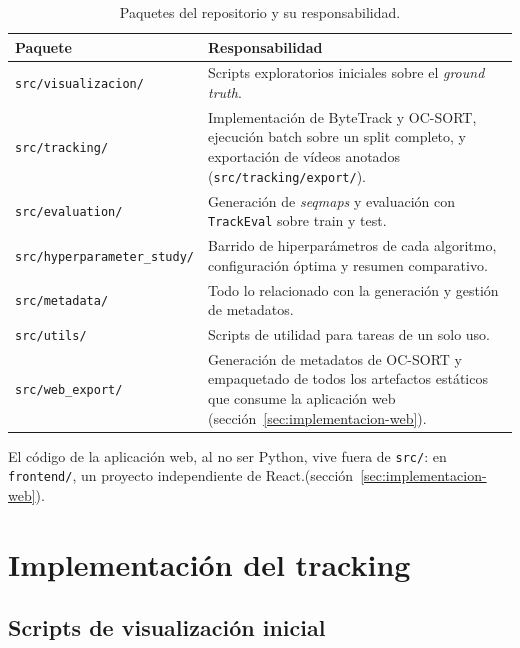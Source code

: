 \begin{table}[htp]
\centering
\caption{Paquetes del repositorio y su responsabilidad.}
\label{tab:impl-estructura}
\renewcommand{\arraystretch}{1.25}
\begin{tabular}{|p{3.6cm}|p{8.3cm}|}
\hline
\rowcolor{gray!25}
\textbf{Paquete} & \textbf{Responsabilidad} \\
\hline
\texttt{src/\allowbreak visualizacion/} & Scripts exploratorios iniciales sobre el
  \emph{ground truth}. \\
\hline
\texttt{src/\allowbreak tracking/} & Implementación de ByteTrack y OC-SORT, ejecución
  batch sobre un split completo, y exportación de vídeos anotados
  (\texttt{src/\allowbreak tracking/\allowbreak export/}). \\
\hline
\texttt{src/\allowbreak evaluation/} & Generación de \emph{seqmaps} y evaluación con
  \texttt{TrackEval} sobre train y test. \\
\hline
\texttt{src/\allowbreak hyperparameter\_\allowbreak study/} & Barrido de hiperparámetros de cada
  algoritmo, configuración óptima y resumen comparativo. \\
\hline
\texttt{src/\allowbreak metadata/} & Todo lo relacionado con la generación y gestión de metadatos. \\
\hline
\texttt{src/\allowbreak utils/} & Scripts de utilidad para tareas de un solo uso. \\
\hline
\texttt{src/\allowbreak web\_\allowbreak export/} & Generación de metadatos de OC-SORT y
  empaquetado de todos los artefactos estáticos que consume la aplicación
  web (sección~\ref{sec:implementacion-web}). \\
\hline
\end{tabular}
\end{table}

El código de la aplicación web, al no ser Python, vive fuera de
\texttt{src/}: en \texttt{frontend/}, un proyecto independiente de React.(sección~\ref{sec:implementacion-web}).

\section{Implementación del tracking}
\label{sec:implementacion-tracking}

\subsection{Scripts de visualización inicial}
\label{subsec:impl-visualizacion}

